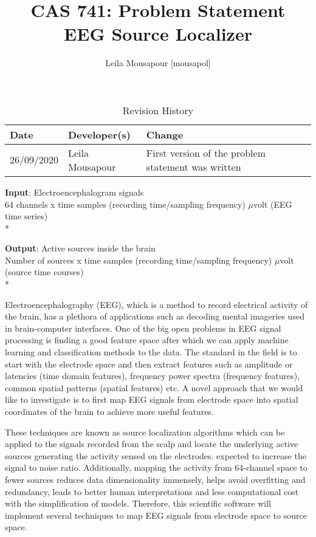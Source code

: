 \documentclass{article}
\title{CAS 741: Problem Statement\\EEG Source Localizer}
\author{Leila Mousapour [mousapol]}
\date{}
\begin{document}
\maketitle

\begin{table}[hp]
\caption{Revision History} \label{TblRevisionHistory}
\begin{tabularx}{\textwidth}{llX}
\toprule
\textbf{Date} & \textbf{Developer(s)} & \textbf{Change}\\
\midrule
26/09/2020 & Leila Mousapour & First version of the problem statement was written\\
\bottomrule
\end{tabularx}
\end{table}

\textbf{Input}: Electroencephalogram signals
\\
{\footnotesize 64 channels x time samples (recording time/sampling frequency) $\mu$volt (EEG time series)}
\\*

\textbf{Output}: Active sources inside the brain
\\
{\footnotesize Number of sources x time samples (recording time/sampling frequency)  $\mu$volt (source time courses)}
\\*

Electroencephalography (EEG), which is a method to record electrical activity of
the brain, has a plethora of applications such as decoding mental imageries used
in brain-computer interfaces. One of the big open problems in EEG signal
processing is finding a good feature space after which we can apply machine
learning and classification methods to the data. The standard in the field is to
start with the electrode space and then extract features such as amplitude or
latencies (time domain features), frequency power spectra (frequency features),
common spatial patterns (spatial features) etc. A novel approach that we would
like to investigate is to first map EEG signals from electrode space into
spatial coordinates of the brain to achieve more useful features.

These techniques are known as source localization algorithms which can be
applied to the signals recorded from the scalp and locate the underlying active
sources generating the activity sensed on the electrodes. expected to increase
the signal to noise ratio. Additionally, mapping the activity from 64-channel
space to fewer sources reduces data dimensionality immensely, helps avoid
overfitting and redundancy, leads to better human interpretations and less
computational cost with the simplification of models. Therefore, this scientific
software will implement several techniques to map EEG signals from electrode
space to source space.




\end{document}
